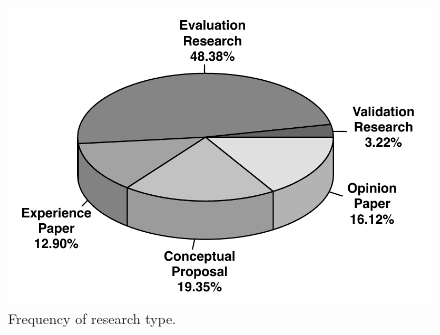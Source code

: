  \begin{figure}[!h]
 \centering
   \includegraphics[scale=0.49]{figuras/pieEvaluation}
 \caption{Frequency of research type.}
 \label{fig:pieEvaluation}
\end{figure} 








